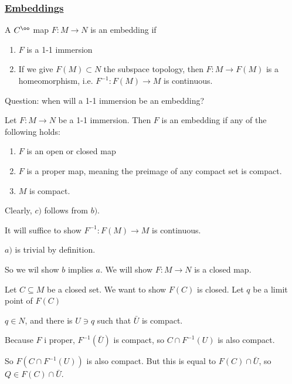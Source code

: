 \documentclass[x11names,reqno,14pt]{extarticle}
\begin{document}
\subsubsection*{\underline{Embeddings}}


A $C^\oo$ map $F:M\to N$ is an embedding if 
\begin{enumerate}

\item $F$ is a 1-1 immersion

\item If we give $F(M) \subset N$ the subspace topology, then $F:M\to F(M)$ is a homeomorphism, i.e. $F^{-1}:F(M)\to M$ is continuous. 

\end{enumerate}

Question: when will a 1-1 immersion be an embedding?

\prop

Let $F:M\to N$ be a 1-1 immersion. Then $F$ is an embedding if any of the following holds:

\begin{enumerate}[label=(\alph*)]

\item $F$ is an open or closed map

\item $F$ is a proper map, meaning the preimage of any compact set is compact. 

\item $M$ is compact.

\end{enumerate}

\proof

Clearly, $c)$ follows from $b)$. 

It will suffice to show $F^{-1}:F(M)\to M$ is continuous. 

$a)$ is trivial by definition.

So we wil show $b$ implies $a$. We will show $F:M\to N$ is a closed map. 

Let $C \subseteq M$ be a closed set. We want to show $F(C)$ is closed. Let $q$ be a limit point of $F(C)$

$q\in N$, and there is $U \ni q$ such that $\bar{U}$ is compact. 

Because $F$ i proper, $F^{-1}(\bar{U})$ is compact, so $C \cap F^{-1}(U)$ is also compact. 

So $F(C\cap F^{-1}(U))$ is also compact. But this is equal to $F(C) \cap \bar{U}$, so $Q \in F(C) \cap \bar{U}$. 
\end{document}

